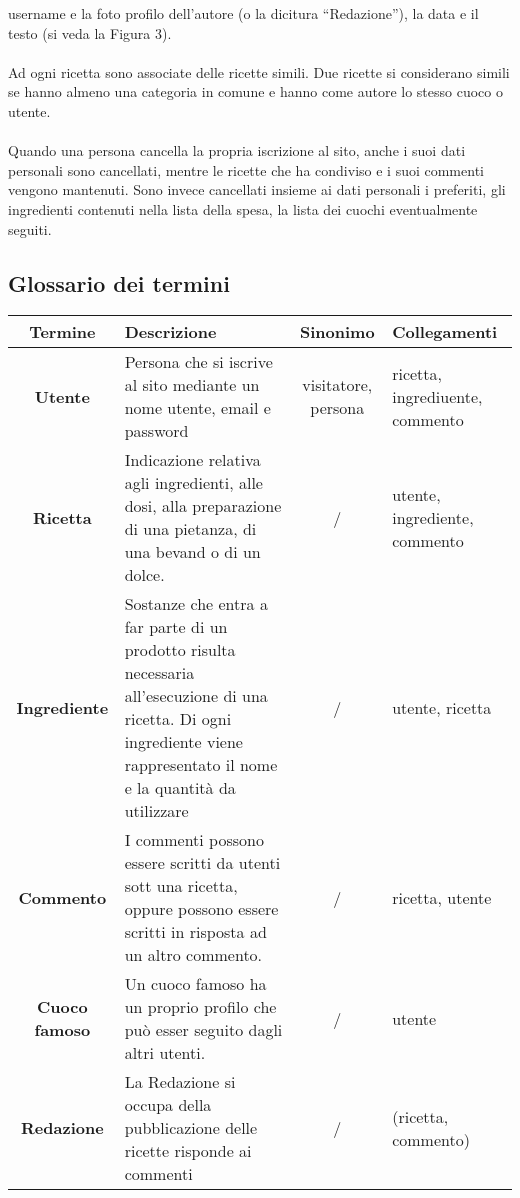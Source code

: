 \documentclass[12pt]{extarticle}
\begin{document}
username e la foto profilo dell’autore (o la dicitura “Redazione”), la data e il testo (si veda la Figura
3).
\\\\
Ad ogni ricetta sono associate delle ricette simili. Due ricette si considerano simili se hanno
almeno una categoria in comune e hanno come autore lo stesso cuoco o utente.
\\\\
Quando una persona cancella la propria iscrizione al sito, anche i suoi dati personali sono
cancellati, mentre le ricette che ha condiviso e i suoi commenti vengono mantenuti. Sono invece
cancellati insieme ai dati personali i preferiti, gli ingredienti contenuti nella lista della spesa, la lista
dei cuochi eventualmente seguiti.

\subsection{Glossario dei termini}
\vspace{2cm}
    \begin{tabularx}{17cm}{c|X|c|X}
    \bfseries Termine      & \bfseries Descrizione  & \bfseries Sinonimo  & \bfseries Collegamenti\\ 
    \hline\hline
    \bfseries Utente       & Persona che si iscrive al sito mediante un nome utente, email e password                                                                                                            & visitatore, persona & ricetta, ingrediuente, commento \\ 
    \hline
    \bfseries Ricetta      & Indicazione relativa agli ingredienti, alle dosi, alla preparazione di una pietanza, di una bevand o di un dolce.                                                              & /                   & utente, ingrediente, commento   \\
    \hline
    \bfseries Ingrediente  & Sostanze che entra a far parte di un prodotto  risulta necessaria all'esecuzione di una ricetta. Di ogni ingrediente viene rappresentato  il nome e la quantità da utilizzare & /                   & utente, ricetta                 \\
    \hline
    \bfseries Commento     & I commenti possono essere scritti da utenti sott una ricetta, oppure possono essere scritti in risposta ad un altro commento.                                                     & /                   & ricetta, utente                 \\
    \hline
    \bfseries Cuoco famoso & Un cuoco famoso ha un proprio profilo che può esser seguito dagli altri utenti.                                                                                                      & /                   & utente                          \\
    \hline
    \bfseries Redazione    & La Redazione si occupa della pubblicazione delle ricette  risponde ai commenti                                                                                                        & /                   & (ricetta, commento)             \\
    \end{tabularx}
\end{document}
